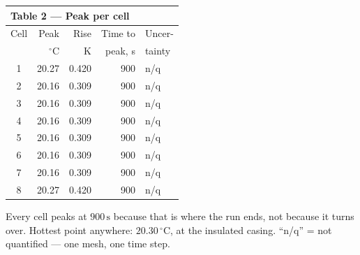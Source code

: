\documentclass[9pt,a4paper]{article}
\renewcommand{\tiny}{\fontsize{5.6}{6.1}\selectfont}
\begin{document}
\vspace{1.5pt}
\begin{minipage}[t]{0.325\textwidth}
{\fontsize{6.8}{7.9}\selectfont
\begin{tabular}{c r r r l}
\multicolumn{5}{l}{\textbf{Table 2 --- Peak per cell}}\\
\toprule
Cell & Peak & Rise & Time to & Uncer- \\
     & $^{\circ}$C & K & peak, s & tainty \\
\midrule
1 & 20.27 & 0.420 & 900 & n/q \\
2 & 20.16 & 0.309 & 900 & n/q \\
3 & 20.16 & 0.309 & 900 & n/q \\
4 & 20.16 & 0.309 & 900 & n/q \\
5 & 20.16 & 0.309 & 900 & n/q \\
6 & 20.16 & 0.309 & 900 & n/q \\
7 & 20.16 & 0.309 & 900 & n/q \\
8 & 20.27 & 0.420 & 900 & n/q \\
\bottomrule
\end{tabular}}

{\tiny Every cell peaks at $900\,\mathrm{s}$ because that is where the run
ends, not because it turns over. Hottest point anywhere:
$20.30\,^{\circ}\mathrm{C}$, at the insulated casing. ``n/q'' = not quantified
--- one mesh, one time step.}
\end{minipage}\hfill
\end{document}
